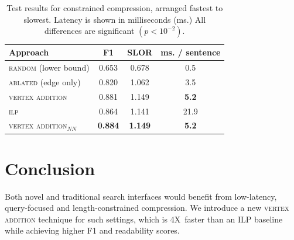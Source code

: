 \documentclass[11pt,a4paper]{article}
\newcommand{\speedup}[0]{4X~}
\begin{document}
\begin{table}[]
\begin{tabular}{lccc}
\centering
Approach & F1 & SLOR &  ms. / sentence  \\ \hline
\textsc{random} {\small (lower bound) }&{\small 0.653}&{\small 0.678}&{\small 0.5}\\
\textsc{ablated} {\small (edge only) }&{\small 0.820}&{\small 1.062}&{\small 3.5}\\
\textsc{vertex addition} & \small 0.881 & {\small 1.149}&\textbf{\small 5.2}\\
\textsc{ilp}&{\small 0.864}&{\small 1.141}&{\small 21.9}\\
\textsc{vertex addition}$_{NN}$&\textbf{\small 0.884}&\textbf{\small 1.149}&\textbf{\small 5.2}\\
\end{tabular}
\caption{Test results for constrained compression, arranged fastest to slowest. Latency is shown in milliseconds (ms.) All differences are significant {\tiny $(p < 10^{-2})$}.}
\label{t:results}
\end{table}

\section{Conclusion}

Both novel and traditional search interfaces would benefit from low-latency, query-focused and length-constrained compression. We introduce a new \textsc{vertex addition} technique for such settings, which is \speedup faster than an ILP baseline while achieving higher F1 and readability scores. 



%



\end{document}
